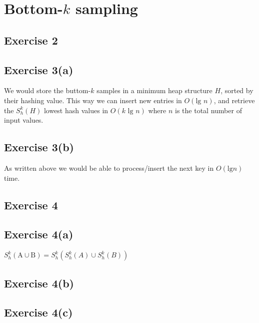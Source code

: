 \section{Bottom-$k$ sampling}

\subsection{Exercise 2}

\subsection{Exercise 3(a)}
We would store the buttom-$k$ samples in a minimum heap structure $H$, sorted by
their hashing value. This way we can insert new entries in $O(\text{lg } n)$,
and retrieve the $S^{k}_{h}(H)$ lowest hash values in $O(k \text{ lg } n)$ where
$n$ is the total number of input values.

\subsection{Exercise 3(b)}
As written above we would be able to process/insert the next key in $O(\text{lg
} n)$ time.


\subsection{Exercise 4}
\subsection{Exercise 4(a)}
$S^{k}_{h}(\text{A} \cup \text{B}) = S^{k}_{h}(S^{k}_{h}(A) \cup S^{k}_{h}(B))$

\subsection{Exercise 4(b)}


\subsection{Exercise 4(c)}